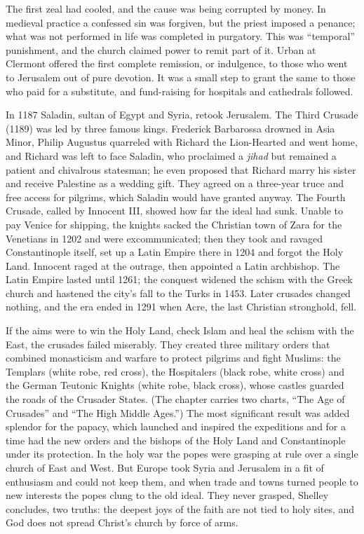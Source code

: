The first zeal had cooled, and the cause was being corrupted by money. In medieval practice a
confessed sin was forgiven, but the priest imposed a penance; what was not performed in life was
completed in purgatory. This was ``temporal'' punishment, and the church claimed power to remit part
of it. Urban at Clermont offered the first complete remission, or indulgence, to those who went to
Jerusalem out of pure devotion. It was a small step to grant the same to those who paid for a
substitute, and fund-raising for hospitals and cathedrals followed.

In 1187 Saladin, sultan of Egypt and Syria, retook Jerusalem. The Third Crusade (1189) was led by
three famous kings. Frederick Barbarossa drowned in Asia Minor, Philip Augustus quarreled with
Richard the Lion-Hearted and went home, and Richard was left to face Saladin, who proclaimed a
\emph{jihad} but remained a patient and chivalrous statesman; he even proposed that Richard marry
his sister and receive Palestine as a wedding gift. They agreed on a three-year truce and free access
for pilgrims, which Saladin would have granted anyway. The Fourth Crusade, called by Innocent III,
showed how far the ideal had sunk. Unable to pay Venice for shipping, the knights sacked the Christian
town of Zara for the Venetians in 1202 and were excommunicated; then they took and ravaged
Constantinople itself, set up a Latin Empire there in 1204 and forgot the Holy Land. Innocent raged at
the outrage, then appointed a Latin archbishop. The Latin Empire lasted until 1261; the conquest
widened the schism with the Greek church and hastened the city's fall to the Turks in 1453. Later
crusades changed nothing, and the era ended in 1291 when Acre, the last Christian stronghold, fell.

If the aims were to win the Holy Land, check Islam and heal the schism with the East, the crusades
failed miserably. They created three military orders that combined monasticism and warfare to protect
pilgrims and fight Muslims: the Templars (white robe, red cross), the Hospitalers (black robe, white
cross) and the German Teutonic Knights (white robe, black cross), whose castles guarded the roads of
the Crusader States. (The chapter carries two charts, ``The Age of Crusades'' and ``The High
Middle Ages.'') The most significant result was added splendor for the papacy, which launched and inspired the
expeditions and for a time had the new orders and the bishops of the Holy Land and Constantinople
under its protection. In the holy war the popes were grasping at rule over a single church of East and West. But Europe took Syria and Jerusalem in a fit of enthusiasm and could not keep them, and
when trade and towns turned people to new interests the popes clung to the old ideal. They never
grasped, Shelley concludes, two truths: the deepest joys of the faith are not tied to holy sites, and God does not spread Christ's church by force of arms.

